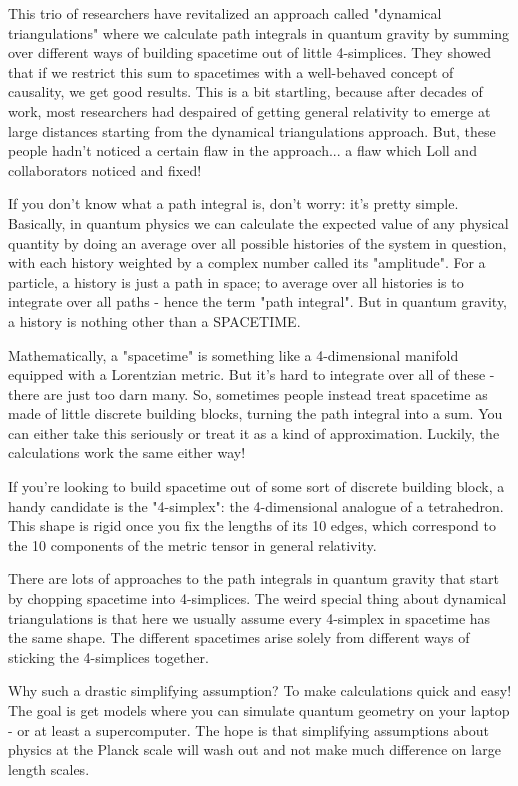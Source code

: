 This trio of researchers have revitalized an approach called "dynamical 
triangulations" where we calculate path integrals in quantum gravity by 
summing over different ways of building spacetime out of little 4-simplices.
They showed that if we restrict this sum to spacetimes with a well-behaved
concept of causality, we get good results.  This is a bit startling,
because after decades of work, most researchers had despaired of getting 
general relativity to emerge at large distances starting from the dynamical 
triangulations approach.  But, these people hadn't noticed a certain flaw 
in the approach... a flaw which Loll and collaborators noticed and fixed!  

If you don't know what a path integral is, don't worry: it's pretty 
simple.  Basically, in quantum physics we can calculate the expected value 
of any physical quantity by doing an average over all possible histories 
of the system in question, with each history weighted by a complex number 
called its "amplitude".  For a particle, a history is just a path in 
space; to average over all histories is to integrate over all paths - 
hence the term "path integral".  But in quantum gravity, a history is 
nothing other than a SPACETIME.

Mathematically, a "spacetime" is something like a 4-dimensional 
manifold 
equipped with a Lorentzian metric.  But it's hard to integrate over all 
of these - there are just too darn many.  So, sometimes people instead 
treat spacetime as made of little discrete building blocks, turning
the path integral into a sum.  You can either take this seriously or treat
it as a kind of approximation.  Luckily, the calculations work the same 
either way!  

If you're looking to build spacetime out of some sort of discrete building
block, a handy candidate is the "4-simplex": the 4-dimensional 
analogue 
of a tetrahedron.   This shape is rigid once you fix the lengths of its 10
edges, which correspond to the 10 components of the metric tensor in 
general relativity.  

There are lots of approaches to the path integrals in quantum gravity
that start by chopping spacetime into 4-simplices.  The weird special
thing about dynamical triangulations is that here we usually assume 
every 4-simplex in spacetime has the same shape.  The different spacetimes
arise solely from different ways of sticking the 4-simplices together.

Why such a drastic simplifying assumption?   To make calculations quick 
and easy!  The goal is get models where you can simulate quantum geometry 
on your laptop - or at least a supercomputer.  The hope is that simplifying 
assumptions about physics at the Planck scale will wash out and not make 
much difference on large length scales.  

